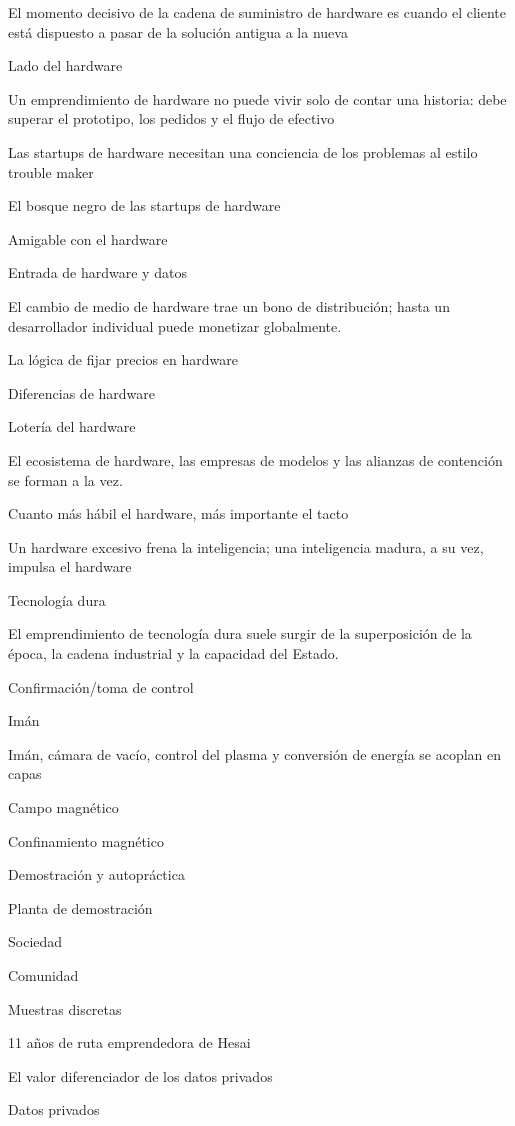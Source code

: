 \documentclass{article}
\begin{document}
El momento decisivo de la cadena de suministro de hardware es cuando el cliente está dispuesto a pasar de la solución antigua a la nueva

Lado del hardware

Un emprendimiento de hardware no puede vivir solo de contar una historia: debe superar el prototipo, los pedidos y el flujo de efectivo

Las startups de hardware necesitan una conciencia de los problemas al estilo trouble maker

El bosque negro de las startups de hardware

Amigable con el hardware

Entrada de hardware y datos

El cambio de medio de hardware trae un bono de distribución; hasta un desarrollador individual puede monetizar globalmente.

La lógica de fijar precios en hardware

Diferencias de hardware

Lotería del hardware

El ecosistema de hardware, las empresas de modelos y las alianzas de contención se forman a la vez.

Cuanto más hábil el hardware, más importante el tacto

Un hardware excesivo frena la inteligencia; una inteligencia madura, a su vez, impulsa el hardware

Tecnología dura

El emprendimiento de tecnología dura suele surgir de la superposición de la época, la cadena industrial y la capacidad del Estado.

Confirmación/toma de control

Imán

Imán, cámara de vacío, control del plasma y conversión de energía se acoplan en capas

Campo magnético

Confinamiento magnético

Demostración y autopráctica

Planta de demostración

Sociedad

Comunidad

Muestras discretas

11 años de ruta emprendedora de Hesai

El valor diferenciador de los datos privados

Datos privados
\end{document}
